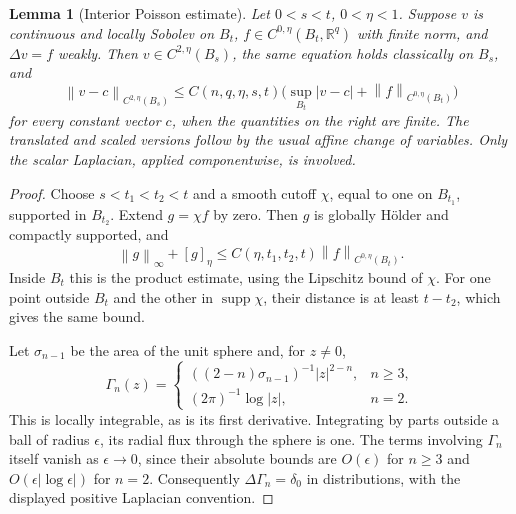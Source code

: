 \documentclass[11pt,a4paper]{article}
\numberwithin{equation}{section}
\newtheorem{lemma}[theorem]{Lemma}
\theoremstyle{definition}
\theoremstyle{remark}
\newcommand{\R}{\mathbb R}
\newcommand{\norm}[1]{\left\lVert#1\right\rVert}
\newcommand{\supp}{\operatorname{supp}}
\begin{document}
\begin{lemma}[Interior Poisson estimate]
\label{lem:schauder}
Let \(0<s<t\), \(0<\eta<1\). Suppose \(v\) is continuous and locally
Sobolev on \(B_t\), \(f\in C^{0,\eta}(B_t,\R^q)\) with finite norm,
and \(\Delta v=f\) weakly. Then \(v\in C^{2,\eta}(B_s)\), the same
equation holds classically on \(B_s\), and
\begin{equation}\label{eq:schauder}
 \norm{v-c}_{C^{2,\eta}(B_s)}
 \le C(n,q,\eta,s,t)
 \bigl(\sup_{B_t}|v-c|+\norm{f}_{C^{0,\eta}(B_t)}\bigr)
\end{equation}
for every constant vector \(c\), when the quantities on the right are finite.
The translated and scaled versions follow by the usual affine change of
variables. Only the scalar Laplacian, applied componentwise, is involved.
\end{lemma}
\begin{proof}
Choose \(s<t_1<t_2<t\) and a smooth cutoff \(\chi\), equal to one on
\(B_{t_1}\), supported in \(B_{t_2}\). Extend \(g=\chi f\) by zero.
Then \(g\) is globally H\"older and compactly supported, and
\begin{equation}\label{eq:cutoffholder}
 \norm{g}_\infty+[g]_\eta
 \le C(\eta,t_1,t_2,t)\norm{f}_{C^{0,\eta}(B_t)}.
\end{equation}
Inside \(B_t\) this is the product estimate, using the Lipschitz bound of
\(\chi\). For one point outside \(B_t\) and the other in \(\supp\chi\),
their distance is at least \(t-t_2\), which gives the same bound.

Let \(\sigma_{n-1}\) be the area of the unit sphere and, for \(z\ne0\),
\begin{equation}\label{eq:fundamental}
 \Gamma_n(z)=
 \begin{cases}
 ((2-n)\sigma_{n-1})^{-1}|z|^{2-n},&n\ge3,\\
 (2\pi)^{-1}\log|z|,&n=2.
 \end{cases}
\end{equation}
This is locally integrable, as is its first derivative. Integrating by
parts outside a ball of radius \(\epsilon\), its radial flux through
the sphere is one. The terms involving \(\Gamma_n\) itself vanish as
\(\epsilon\to0\), since their absolute bounds are \(O(\epsilon)\) for
\(n\ge3\) and \(O(\epsilon|\log\epsilon|)\) for \(n=2\). Consequently
\(\Delta\Gamma_n=\delta_0\) in distributions, with the displayed positive
Laplacian convention.


\end{proof}
\end{document}
